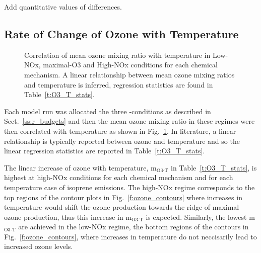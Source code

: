 Add quantitative values of differences.

\subsection{Rate of Change of Ozone with Temperature} \label{ss:r_mO3-T}

\begin{figure}%
    \centering%
    \caption{Correlation of mean ozone mixing ratio with temperature in Low-NOx, maximal-O3 and High-NOx conditions for each chemical mechanism. A linear relationship between mean ozone mixing ratios and temperature is inferred, regression statistics are found in Table~\ref{t:O3_T_stats}.}%
    \label{f:rate_O3_T}%
\end{figure}

\begin{table}%
    \centering%
    \caption{Regression statistics for the linear relationship between ozone mixing ratios and temperature shown in Figure~\ref{f:rate_O3_T}.}%
    \label{t:O3_T_stats}%
    
\end{table}

Each model run was allocated the three -conditions as described in Sect.~\ref{ss:r_budgets} and then the mean ozone mixing ratio in these  regimes were then correlated with temperature as shown in Fig.~\ref{f:rate_O3_T}.
In literature, a linear relationship is typically reported between ozone and temperature and so the linear regression statistics are reported in Table~\ref{t:O3_T_stats}.

The linear increase of ozone with temperature, m$_{\text{O3-T}}$ in Table~\ref{t:O3_T_stats}, is highest at high-NOx conditions for each chemical mechanism and for each temperature case of isoprene emissions.
The high-NOx regime corresponds to the top regions of the contour plots in Fig.~\ref{f:ozone_contours} where increases in temperature would shift the ozone production towards the ridge of maximal ozone production, thus this increase in m$_{\text{O3-T}}$ is expected.
Similarly, the lowest m$_{\text{O3-T}}$ are achieved in the low-NOx regime, the bottom regions of the contours in Fig.~\ref{f:ozone_contours}, where increases in temperature do not neccisarily lead to increased ozone levels.
